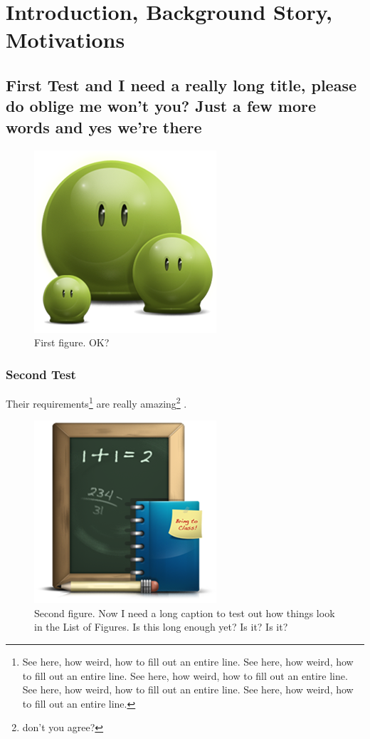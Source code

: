 \chapter{Introduction, Background Story, Motivations}
\section{First Test and I need a really long title, please do oblige me won't you? Just a few more words and yes we're there}
\lipsum[1-2]

\begin{figure}[hbt!]\centering
\includegraphics[width=.3\textwidth]{green}
\caption{First figure. OK?}
\end{figure}

\subsection{Second Test}
Their \cite{audibert:2004} requirements\footnote{See here, how weird, how to fill out an entire line. See here, how weird, how to fill out an entire line. See here, how weird, how to fill out an entire line. See here, how weird, how to fill out an entire line. See here, how weird, how to fill out an entire line. } are really amazing\footnote{don't you agree?} \cite{budanitsky:hirst:2006}.

\begin{figure}[hbt!]\centering
\includegraphics[width=.3\textwidth]{school}
\caption{Second figure. Now I need a long caption to test out how things look in the List of Figures. Is this long enough yet? Is it? Is it?}
\end{figure}

